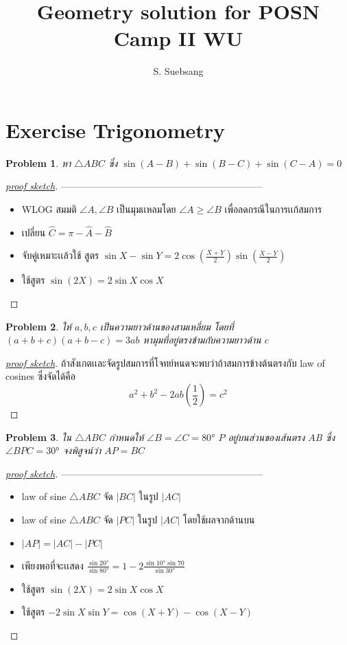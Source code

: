 \documentclass[a4paper,12pt]{article}
\author{S. Suebsang}
\title{\textbf{Geometry solution for POSN Camp II WU}}
\newtheorem{problem}{Problem}[section]
\begin{document}
	
	\maketitle
	\section{Exercise Trigonometry}
		\begin{problem}
			หา $\bigtriangleup{ABC}$ ซึ่ง $\sin{(A-B)}+\sin{(B-C)}+\sin{(C-A)}=0$
		\end{problem}
		\begin{proof}[\underline{proof sketch}] ---------------------------------------------------------------
			\begin{itemize}
				\item WLOG สมมติ $\angle{A}, \angle{B}$ เป็นมุมเเหลมโดย $\angle{A} \ge \angle{B}$ เพื่อลดกรณีในการเเก้สมการ
				\item เปลี่ยน $\hat{C} = \pi - \hat{A} - \hat{B}$
				\item จับคู่เหมาะเเล้วใช้ สูตร $\sin{X}-\sin{Y} = 2\cos{(\frac{X+Y}{2})}\sin{(\frac{X-Y}{2})}$
				\item ใช้สูตร $\sin{(2X)} = 2\sin{X}\cos{X}$
			\end{itemize}
			

			
		\end{proof}
		\begin{problem}
			ให้ $a,b,c$ เป็นความยาวด้านของสามเหลี่ยม โดยที่ $(a+b+c)(a+b-c)=3ab$ หามุมที่อยู่ตรงข้ามกับความยาวด้าน $c$
		\end{problem}
		\begin{proof}[\underline{proof sketch}] 
			ถ้าสังเกตเเละจัดรูปสมการที่โจทย์หนดจะพบว่าถ้าสมการข้างต้นตรงกับ law of cosines ซึ่งจัดได้คือ \\
			$$ a^2+b^2-2ab(\frac{1}{2}) = c^2$$
		\end{proof}
	\newpage
		\begin{problem}
			ใน $\bigtriangleup{ABC}$ กำหนดให้ $\angle{B} = \angle{C} = \ang{80}$ $P$ อยู่บนส่วนของเส้นตรง $A$B ซึ่ง $\angle{BPC}=\ang{30}$ จงพิสูจน์ว่า $AP = BC$
		\end{problem}
	    \begin{proof}[\underline{proof sketch}]
	    	 ---------------------------------------------------------------
	    	\begin{itemize}
	    		\item law of sine $\bigtriangleup{ABC}$ จัด $|BC|$ ในรูป $|AC|$
	    		\item law of sine  $\bigtriangleup{ABC}$ จัด $|PC|$ ในรูป $|AC|$ โดยใช้ผลจากด้านบน
	    		\item $|AP| = |AC| - |PC|$ 
	    		\item เพียงพอที่จะเเสดง $\frac{\sin{\ang{20}}}{\sin{\ang{80}}} = 1 -2\frac{\sin{\ang{10}}\sin{70}}{\sin{\ang{30}}}$  
	    		\item ใช้สูตร $\sin{(2X)} = 2\sin{X}\cos{X}$ 
	    		\item ใช้สูตร $-2\sin{X}\sin{Y} = \cos{(X+Y)} - \cos{(X-Y)}$
	    	\end{itemize}
  
	    	
	    \end{proof} 
\end{document}
